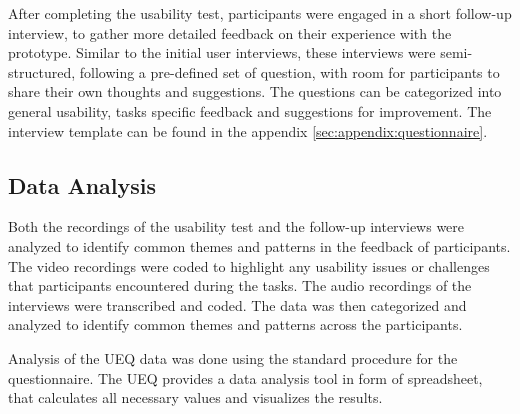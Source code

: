 After completing the usability test, participants were engaged in a short follow-up interview, to gather more detailed feedback on their experience with the prototype. 
Similar to the initial user interviews, these interviews were semi-structured, following a pre-defined set of question, with room for participants to share their own thoughts and suggestions.
The questions can be categorized into general usability, tasks specific feedback and suggestions for improvement.
The interview template can be found in the appendix \ref{sec:appendix:questionnaire}.


\subsection{Data Analysis}
\label{sec:methodology:study:analysis}

Both the recordings of the usability test and the follow-up interviews were analyzed to identify common themes and patterns in the feedback of participants.
The video recordings were coded to highlight any usability issues or challenges that participants encountered during the tasks.
The audio recordings of the interviews were transcribed and coded.
The data was then categorized and analyzed to identify common themes and patterns across the participants.

Analysis of the UEQ data was done using the standard procedure for the questionnaire.
The UEQ provides a data analysis tool in form of spreadsheet, that calculates all necessary values and visualizes the results.
